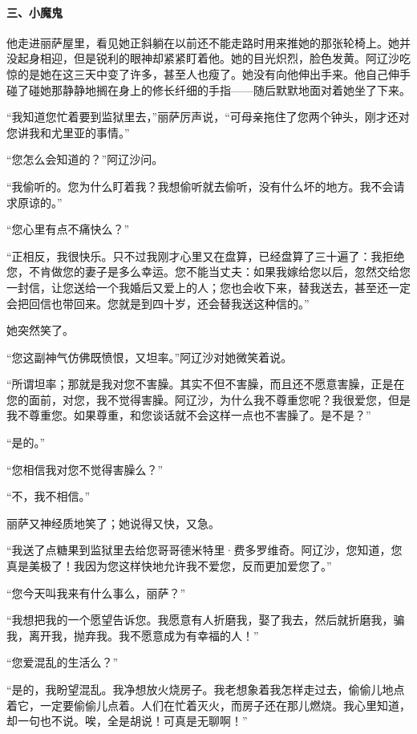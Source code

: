 \paragraph*{三、小魔鬼}
\par 他走进丽萨屋里，看见她正斜躺在以前还不能走路时用来推她的那张轮椅上。她并没起身相迎，但是锐利的眼神却紧紧盯着他。她的目光炽烈，脸色发黄。阿辽沙吃惊的是她在这三天中变了许多，甚至人也瘦了。她没有向他伸出手来。他自己伸手碰了碰她那静静地搁在身上的修长纤细的手指——随后默默地面对着她坐了下来。
\par “我知道您忙着要到监狱里去，”丽萨厉声说，“可母亲拖住了您两个钟头，刚才还对您讲我和尤里亚的事情。”
\par “您怎么会知道的？”阿辽沙问。
\par “我偷听的。您为什么盯着我？我想偷听就去偷听，没有什么坏的地方。我不会请求原谅的。”
\par “您心里有点不痛快么？”
\par “正相反，我很快乐。只不过我刚才心里又在盘算，已经盘算了三十遍了：我拒绝您，不肯做您的妻子是多么幸运。您不能当丈夫：如果我嫁给您以后，忽然交给您一封信，让您送给一个我婚后又爱上的人；您也会收下来，替我送去，甚至还一定会把回信也带回来。您就是到四十岁，还会替我送这种信的。”
\par 她突然笑了。
\par “您这副神气仿佛既愤恨，又坦率。”阿辽沙对她微笑着说。
\par “所谓坦率；那就是我对您不害臊。其实不但不害臊，而且还不愿意害臊，正是在您的面前，对您，我不觉得害臊。阿辽沙，为什么我不尊重您呢？我很爱您，但是我不尊重您。如果尊重，和您谈话就不会这样一点也不害臊了。是不是？”
\par “是的。”
\par “您相信我对您不觉得害臊么？”
\par “不，我不相信。”
\par 丽萨又神经质地笑了；她说得又快，又急。
\par “我送了点糖果到监狱里去给您哥哥德米特里·费多罗维奇。阿辽沙，您知道，您真是美极了！我因为您这样快地允许我不爱您，反而更加爱您了。”
\par “您今天叫我来有什么事么，丽萨？”
\par “我想把我的一个愿望告诉您。我愿意有人折磨我，娶了我去，然后就折磨我，骗我，离开我，抛弃我。我不愿意成为有幸福的人！”
\par “您爱混乱的生活么？”
\par “是的，我盼望混乱。我净想放火烧房子。我老想象着我怎样走过去，偷偷儿地点着它，一定要偷偷儿点着。人们在忙着灭火，而房子还在那儿燃烧。我心里知道，却一句也不说。唉，全是胡说！可真是无聊啊！”

